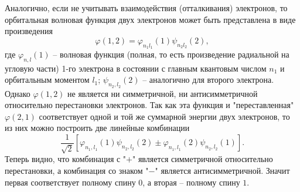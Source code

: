 Аналогично, если не учитывать взаимодействия (отталкивания) электронов, то орбитальная волновая функция двух электронов может быть представлена в виде произведения
\begin{equation*}
	\varphi(1,2) = \varphi_{n_1 l_1}(1) \psi_{n_2 l_2}(2),
\end{equation*}
где $\varphi_{n, l} (1)$ -- волновая функция (полная, то есть произведение радиальной на угловую части) 1-го электрона в состоянии с главным квантовым числом $n_1$ и орбитальным моментом $l_1$; $\psi_{n_2, l_2}(2)$ -- аналогично для второго электрона.
Однако $\varphi(1,2)$ не является ни симметричной, ни антисимметричной относительно перестановки электронов.
Так как эта функция и "переставленная" $\varphi(2,1)$ соответствует одной и той же суммарной энергии двух электронов, то из них можно построить две линейные комбинации
\begin{equation*}
	\frac{1}{\sqrt{2}}[\varphi_{n_1, l_1}(1) \psi_{n_2, l_2}(2) 
	\pm 
	\varphi_{n_1, l_1}(2) \psi_{n_2, l_2}(1)].
\end{equation*}
Теперь видно, что комбинация с "$+$" является симметричной относительно перестановки, а комбинация со знаком  "$-$" является антисимметричной.
Значит первая соответствует полному спину $0$, а вторая -- полному спину $1$.